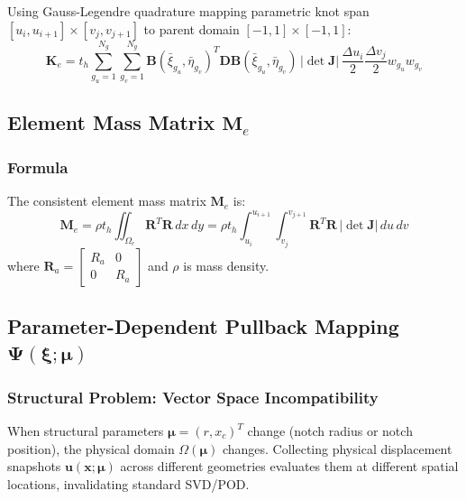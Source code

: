 Using Gauss-Legendre quadrature mapping parametric knot span $[u_i, u_{i+1}] \times [v_j, v_{j+1}]$ to parent domain $[-1, 1] \times [-1, 1]$:
\begin{equation}
\mathbf{K}_e = t_h \sum_{g_u=1}^{N_g} \sum_{g_v=1}^{N_g} \mathbf{B}(\bar{\xi}_{g_u}, \bar{\eta}_{g_v})^T \mathbf{D} \mathbf{B}(\bar{\xi}_{g_u}, \bar{\eta}_{g_v}) \, |\det \mathbf{J}| \, \frac{\Delta u_i}{2} \frac{\Delta v_j}{2} w_{g_u} w_{g_v}
\end{equation}

\hr

\subsection{Element Mass Matrix $\mathbf{M}_e$}

\subsubsection{Formula}
The consistent element mass matrix $\mathbf{M}_e$ is:
\begin{equation}
\mathbf{M}_e = \rho t_h \iint_{\Omega_e} \mathbf{R}^T \mathbf{R} \, dx \, dy = \rho t_h \int_{u_i}^{u_{i+1}} \int_{v_j}^{v_{j+1}} \mathbf{R}^T \mathbf{R} \, |\det \mathbf{J}| \, du \, dv
\end{equation}
where $\mathbf{R}_a = \begin{bmatrix} R_a & 0 \\ 0 & R_a \end{bmatrix}$ and $\rho$ is mass density.

\hr

\subsection{Parameter-Dependent Pullback Mapping $\boldsymbol{\Psi}(\boldsymbol{\xi}; \boldsymbol{\mu})$}

\subsubsection{Structural Problem: Vector Space Incompatibility}
When structural parameters $\boldsymbol{\mu} = (r, x_c)^T$ change (notch radius or notch position), the physical domain $\Omega(\boldsymbol{\mu})$ changes. Collecting physical displacement snapshots $\mathbf{u}(\mathbf{x}; \boldsymbol{\mu})$ across different geometries evaluates them at different spatial locations, invalidating standard SVD/POD.

